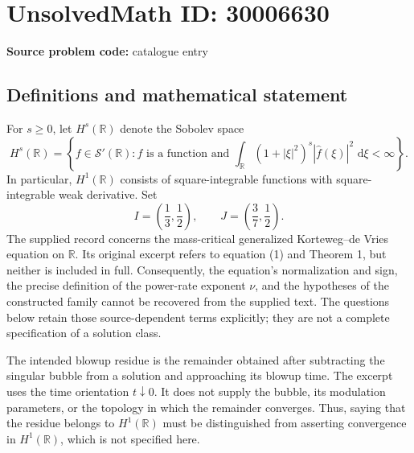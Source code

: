\documentclass[11pt]{article}
\newcommand{\R}{\mathbb{R}}
\newcommand{\dd}{\,\mathrm{d}}
\begin{document}
\section*{UnsolvedMath ID: 30006630}
\textbf{Source problem code:} catalogue entry
\subsection{Definitions and mathematical statement}
For \(s\geq 0\), let \(H^s(\R)\) denote the Sobolev space
\[
H^s(\R)=\left\{f\in\mathcal S'(\R):\widehat f\text{ is a function and }\int_{\R}(1+|\xi|^2)^s|\widehat f(\xi)|^2\,\dd\xi<\infty\right\}.
\]
In particular, \(H^1(\R)\) consists of square-integrable functions with square-integrable weak derivative. Set
\[
I=\left(\frac13,\frac12\right),\qquad J=\left(\frac37,\frac12\right).
\]
The supplied record concerns the mass-critical generalized Korteweg--de Vries equation on \(\R\). Its original excerpt refers to equation (1) and Theorem 1, but neither is included in full. Consequently, the equation's normalization and sign, the precise definition of the power-rate exponent \(\nu\), and the hypotheses of the constructed family cannot be recovered from the supplied text. The questions below retain those source-dependent terms explicitly; they are not a complete specification of a solution class.

The intended blowup residue is the remainder obtained after subtracting the singular bubble from a solution and approaching its blowup time. The excerpt uses the time orientation \(t\downarrow0\). It does not supply the bubble, its modulation parameters, or the topology in which the remainder converges. Thus, saying that the residue belongs to \(H^1(\R)\) must be distinguished from asserting convergence in \(H^1(\R)\), which is not specified here.
\end{document}
